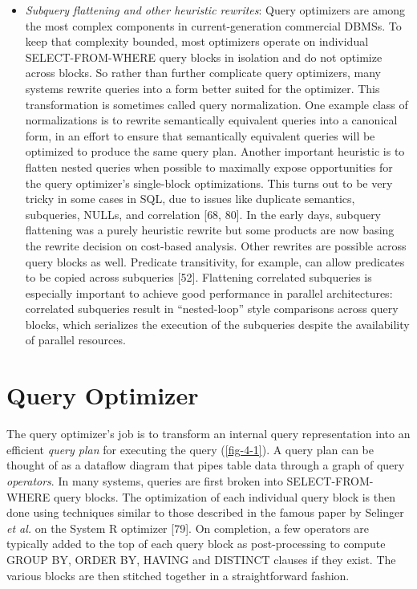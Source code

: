 \documentclass[b5paper,11pt,twoside,openright]{book}
\begin{document}
\begin{itemize}
\item
  \emph{Subquery flattening and other heuristic rewrites}: Query
  optimizers are among the most complex components in current-generation
  commercial DBMSs. To keep that complexity bounded, most optimizers
  operate on individual SELECT-FROM-WHERE query blocks in isolation and
  do not optimize across blocks. So rather than further complicate query
  optimizers, many systems rewrite queries into a form better suited for
  the optimizer. This transformation is sometimes called query
  normalization. One example class of normalizations is to rewrite
  semantically equivalent queries into a canonical form, in an effort to
  ensure that semantically equivalent queries will be optimized to
  produce the same query plan. Another important heuristic is to flatten
  nested queries when possible to maximally expose opportunities for the
  query optimizer's single-block optimizations. This turns out to be
  very tricky in some cases in SQL, due to issues like duplicate
  semantics, subqueries, NULLs, and correlation {[}68, 80{]}. In the
  early days, subquery flattening was a purely heuristic rewrite but
  some products are now basing the rewrite decision on cost-based
  analysis. Other rewrites are possible across query blocks as well.
  Predicate transitivity, for example, can allow predicates to be copied
  across subqueries {[}52{]}. Flattening correlated subqueries is
  especially important to achieve good performance in parallel
  architectures: correlated subqueries result in ``nested-loop'' style
  comparisons across query blocks, which serializes the execution of the
  subqueries despite the availability of parallel resources.
\end{itemize}

\hypertarget{query-optimizer}{%
\section{Query Optimizer}\label{query-optimizer}}

The query optimizer's job is to transform an internal query
representation into an efficient \emph{query plan} for executing the
query (\autoref{fig-4-1}). A query plan can be thought of as a dataflow diagram
that pipes table data through a graph of query \emph{operators}. In many
systems, queries are first broken into SELECT-FROM-WHERE query blocks.
The optimization of each individual query block is then done using
techniques similar to those described in the famous paper by Selinger
\emph{et al.} on the System R optimizer {[}79{]}. On completion, a few
operators are typically added to the top of each query block as
post-processing to compute GROUP BY, ORDER BY, HAVING and DISTINCT
clauses if they exist. The various blocks are then stitched together in
a straightforward fashion.
\end{document}
